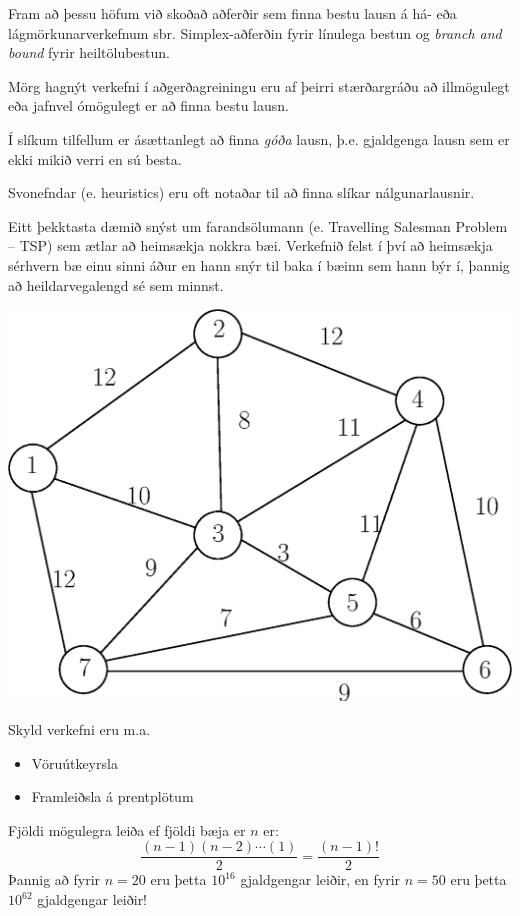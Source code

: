 Fram að þessu höfum við skoðað aðferðir sem finna bestu lausn á há- eða lágmörkunarverkefnum sbr. Simplex-aðferðin fyrir línulega bestun og \emph{branch and bound} fyrir heiltölubestun.

Mörg hagnýt verkefni í aðgerðagreiningu eru af þeirri stærðargráðu að illmögulegt eða jafnvel ómögulegt er að finna bestu lausn.

Í slíkum tilfellum er ásættanlegt að finna \emph{góða} lausn, þ.e. gjaldgenga lausn sem er ekki mikið verri en sú besta.

Svonefndar  (e. heuristics) eru oft notaðar til að finna slíkar nálgunarlausnir.

Eitt þekktasta dæmið snýst um farandsölumann (e. Travelling Salesman Problem -- TSP) sem ætlar að heimsækja nokkra bæi. Verkefnið felst í því að heimsækja sérhvern bæ einu sinni áður en hann snýr til baka í bæinn sem hann býr í, þannig að heildarvegalengd sé sem minnst.

\begin{daemi}[TSP]\label{daemi:tsp}\hspace{.1cm}
\begin{center}
  \includegraphics[width=0.6\columnwidth]{figs/tsp.eps}
\end{center}
\end{daemi}

Skyld verkefni eru m.a.
\begin{itemize}
  \item Vöruútkeyrsla
  \item Framleiðsla á prentplötum
\end{itemize}

\begin{aths}Fjöldi mögulegra leiða ef fjöldi bæja er $n$ er:
$$ \frac{(n-1)(n-2)\cdots(1)}{2}=\frac{(n-1)!}{2}$$
Þannig að fyrir $n=20$ eru þetta $10^{16}$ gjaldgengar leiðir, en fyrir $n=50$ eru þetta $10^{62}$ gjaldgengar leiðir!  
\end{aths}

